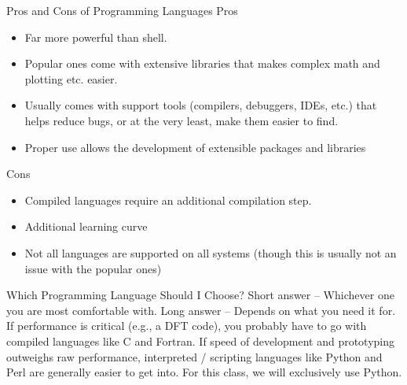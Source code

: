 \documentclass[aspectratio=169]{beamer}
\begin{document}
    \begin{frame}{Pros and Cons of Programming Languages}
        Pros
        \begin{itemize}
            \item Far more powerful than shell.
            \item Popular ones come with extensive libraries that makes complex math and plotting etc. easier.
            \item Usually comes with support tools (compilers, debuggers, IDEs, etc.) that helps reduce bugs, or at the very least, make them easier to find.
            \item Proper use allows the development of extensible packages and libraries
        \end{itemize}

        Cons

        \begin{itemize}
            \item Compiled languages require an additional compilation step.
            \item Additional learning curve
            \item Not all languages are supported on all systems (though this is usually not an issue with the popular ones)

        \end{itemize}

    \end{frame}

    \begin{frame}{Which Programming Language Should I Choose?}
        Short answer – Whichever one you are most comfortable with.\newline
        \newline
        Long answer – Depends on what you need it for.\newline
        \newline
        If performance is critical (e.g., a DFT code), you probably have to go with compiled languages like C and Fortran.
        If speed of development and prototyping outweighs raw performance, interpreted / scripting languages like Python and Perl are generally easier to get into.\newline
        \newline
        For this class, we will exclusively use Python.

    \end{frame}
\end{document}

